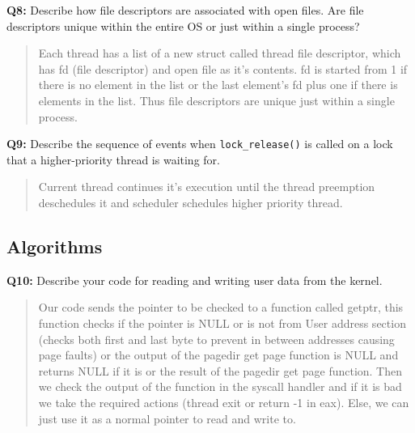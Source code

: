 \documentclass[a4paper,11pt]{paper}
\begin{document}
\textbf{Q8:} Describe how file descriptors are associated with open files. Are file descriptors unique within the entire OS or just within a single process?
\begin{quote}
    Each thread has a list of a new struct called thread file descriptor, which has fd (file descriptor) and open file as it's contents. fd is started from 1 if there is no element in the list or the last element's fd plus one if there is elements in the list. Thus file descriptors are unique just within a single process.
\end{quote}

\textbf{Q9:} Describe the sequence of events when \texttt{lock\_release()} is called on a lock that a higher-priority thread is waiting for.
\begin{quote}
    Current thread continues it's execution until the thread preemption deschedules it and scheduler schedules higher priority thread.
\end{quote}

\subsection{Algorithms}

\textbf{Q10:} Describe your code for reading and writing user data from the kernel.
\begin{quote}
  Our code sends the pointer to be checked to a function called getptr, this function checks if the pointer is NULL or is not from User address section (checks both first and last byte to prevent in between addresses causing page faults) or the output of the pagedir get page function is NULL and returns NULL if it is or the result of the pagedir get page function. Then we check the output of the function in the syscall handler and if it is bad we take the required actions (thread exit or return -1 in eax). Else, we can just use it as a normal pointer to read and write to.  
\end{quote}
\end{document}

